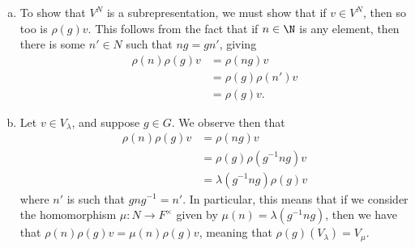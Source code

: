 \documentclass[10pt]{mypackage}
\begin{document}
\begin{solution}\hfill
  \begin{enumerate}[(a)]
    \item To show that $V^N$ is a subrepresentation, we must show that if $v\in V^N$, then so too is $\rho(g)v$. This follows from the fact that if $n\in \N$ is any element, then there is some $n'\in N$ such that $ng = gn'$, giving
      \begin{align*}
        \rho(n)\rho(g)v &= \rho\left( ng \right)v\\
                        &= \rho(g)\rho\left( n' \right)v\\
                        &= \rho(g)v.
      \end{align*}
    \item Let $v\in V_{\lambda}$, and suppose $g\in G$. We observe then that
      \begin{align*}
        \rho(n)\rho(g)v &= \rho\left( ng \right)v\\
                        &= \rho\left( g \right)\rho\left( g^{-1}ng \right)v\\
                        &= \lambda\left( g^{-1}ng \right)\rho\left( g \right)v
      \end{align*}
      where $n'$ is such that $gng^{-1} = n'$. In particular, this means that if we consider the homomorphism $\mu\colon N\rightarrow F^{\times}$ given by $\mu\left( n \right) = \lambda\left( g^{-1}ng \right)$, then we have that $\rho(n)\rho(g)v = \mu(n)\rho(g)v$, meaning that $\rho(g)\left( V_{\lambda} \right) = V_{\mu}$.
  \end{enumerate}
\end{solution}
\end{document}
